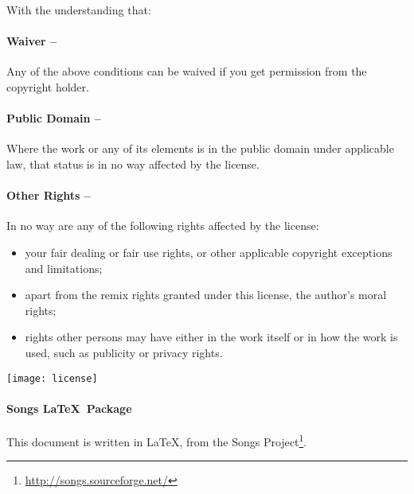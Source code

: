 \begin{lblock}{With the understanding that:}
  
  \hspace{0.4cm}
  \parbox{15cm}{
    \paragraph{Waiver --} 
    Any of the above conditions can be waived if you get permission 
    from the copyright holder.
        
    \paragraph{Public Domain --} 
    Where the work or any of its elements is in the public domain
    under applicable law, that status is in no way affected by the
    license.

    \paragraph{Other Rights --} 
    In no way are any of the following rights affected by the license:
    \begin{itemize}
    \item your fair dealing or fair use rights, or other applicable
      copyright exceptions and limitations;
    \item apart from the remix rights granted under this license, 
      the author's moral rights;
    \item rights other persons may have either in the work itself 
      or in how the work is used, such as publicity or privacy rights.
    \end{itemize}
  }
  
  \begin{center}
    \texttt{[image: license]}
  \end{center}

\end{lblock}
\paragraph{Songs \LaTeX~Package}
This document is written in \LaTeX, from the Songs
Project\footnote{\url{http://songs.sourceforge.net/}}.

